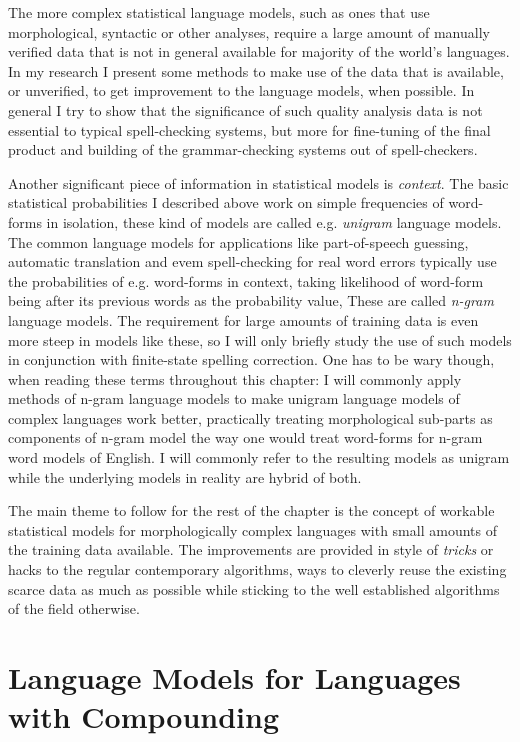 \documentclass[officiallayout]{unihelcompling}
\begin{document}
The more complex statistical language models, such as ones that use
morphological, syntactic or other analyses, require a large amount of
manually verified data that is not in general available for majority of the
world's languages. In my research I present some methods to make use of the
data that is available, or unverified, to get improvement to the language
models, when possible. In general I try to show that the significance of such
quality analysis data is not essential to typical spell-checking systems, but
more for fine-tuning of the final product and building of the grammar-checking
systems out of spell-checkers.

Another significant piece of information in statistical models is
\emph{context}. The basic statistical probabilities I described above work on
simple frequencies of word-forms in isolation, these kind of models are called
e.g. \emph{unigram} language models. The common language models for
applications like part-of-speech guessing, automatic translation and evem
spell-checking for real word errors typically use the probabilities of e.g.
word-forms in context, taking likelihood of word-form being after its previous
words as the probability value, These are called \emph{n-gram} language models.
The requirement for large amounts of training data is even more steep in models
like these, so I will only briefly study the use of such models in conjunction
with finite-state spelling correction. One has to be wary though, when reading
these terms throughout this chapter: I will commonly apply methods of
n-gram language models to make unigram language models of complex languages
work better, practically treating morphological sub-parts as components
of n-gram model the way one would treat word-forms for n-gram word models of
English. I will commonly refer to the resulting models as unigram while the
underlying models in reality are hybrid of both.

The main theme to follow for the rest of the chapter is the concept of workable
statistical models for morphologically complex languages with small amounts of
the training data available. The improvements are provided in style of
\emph{tricks} or hacks to the regular contemporary algorithms, ways to cleverly
reuse the existing scarce data as much as possible while sticking to the well
established algorithms of the field otherwise.

\section{Language Models for Languages with Compounding}
\label{sec:compounding}
\end{document}
